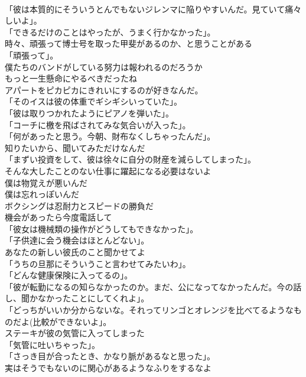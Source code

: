 \documentclass[8pt]{extreport}
\begin{document}
\begin{CJK}{UTF8}{min}
\\	「彼は本質的にそういうとんでもないジレンマに陥りやすいんだ。見ていて痛々しいよ」。	
\\	「できるだけのことはやったが、うまく行かなかった」。	
\\	時々、頑張って博士号を取った甲斐があるのか、と思うことがある	
\\	「頑張って」。	
\\	僕たちのバンドがしている努力は報われるのだろうか	
\\	もっと一生懸命にやるべきだったね	
\\	アパートをピカピカにきれいにするのが好きなんだ。	
\\	「そのイスは彼の体重でギシギシいっていた」。	
\\	「彼は取りつかれたようにピアノを弾いた」。	
\\	「コーチに檄を飛ばされてみな気合いが入った」。	
\\	「何があったと思う。今朝、財布なくしちゃったんだ」。	
\\	知りたいから、聞いてみただけなんだ	
\\	「まずい投資をして、彼は徐々に自分の財産を減らしてしまった」。	
\\	そんな大したことのない仕事に躍起になる必要はないよ	
\\	僕は物覚えが悪いんだ	
\\	僕は忘れっぽいんだ	
\\	ボクシングは忍耐力とスピードの勝負だ	
\\	機会があったら今度電話して	
\\	「彼女は機械類の操作がどうしてもできなかった」。	
\\	「子供達に会う機会はほとんどない」。	
\\	あなたの新しい彼氏のこと聞かせてよ	
\\	「うちの旦那にそういうこと言わせてみたいわ」。	
\\	「どんな健康保険に入ってるの」。	
\\	「彼が転勤になるの知らなかったのか。まだ、公になってなかったんだ。今の話し、聞かなかったことにしてくれよ」。	
\\	「どっちがいいか分からないな。それってリンゴとオレンジを比べてるようなものだよ(比較ができないよ」。	
\\	ステーキが彼の気管に入ってしまった	
\\	「気管に吐いちゃった」。	
\\	「さっき目が合ったとき、かなり脈があるなと思った」。	
\\	実はそうでもないのに関心があるようなふりをするなよ	

\end{CJK}
\end{document}

